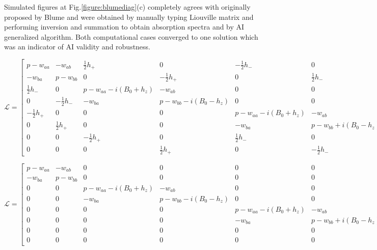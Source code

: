 Simulated figures at Fig.\ref{figure:blumediag}(c) completely agrees with originally proposed by Blume \cite{blume} and were obtained by manually typing Liouville matrix and performing inversion and summation to obtain absorption spectra and by AI generalized algorithm. Both computational cases converged to one solution which was an indicator of AI validity and robustness.           
           
\clearpage
\begin{landscape}
\begin{equation}\label{eq:60}
\mathcal{L} = \begin{bmatrix}
       p-w_{aa} & -w_{ab} & \frac{1}{2}h_+ & 0 & -\frac{1}{2}h_- & 0 & 0 & 0  \\[0.3em]
       -w_{ba} & p-w_{bb} & 0 & -\frac{1}{2}h_+ & 0 & \frac{1}{2}h_- & 0 & 0  \\[0.3em]
       \frac{1}{2}h_- & 0 & p-w_{aa}-i(B_0+h_z) & -w_{ab} & 0 & 0 & -\frac{1}{2}h_- & 0  \\[0.3em]
       0 & -\frac{1}{2}h_- & -w_{ba} & p-w_{bb}-i(B_0-h_z) & 0 & 0 & 0 & \frac{1}{2}h_-  \\[0.3em]
       -\frac{1}{2}h_+ & 0 & 0 & 0 & p-w_{aa}-i(B_0+h_z) & -w_{ab} & \frac{1}{2}h_+ & 0  \\[0.3em]
       0 & \frac{1}{2}h_+ & 0 & 0 & -w_{ba} & p-w_{bb}+i(B_0-h_z) & 0 & -\frac{1}{2}h_+  \\[0.3em]
       0 & 0 & -\frac{1}{2}h_+ & 0 & \frac{1}{2}h_- & 0 & p-w_{aa} & -w_{ab}  \\[0.3em]
       0 & 0 & 0 & \frac{1}{2}h_+ & 0 & -\frac{1}{2}h_- & -w_{ba} & p-w_{bb} 
     \end{bmatrix}
\end{equation}
\end{landscape} 

\begin{landscape}
\begin{equation}\label{eq:61}
\mathcal{L} = \begin{bmatrix}
       p-w_{aa} & -w_{ab} & 0 & 0 & 0 & 0 & 0 & 0  \\[0.3em]
       -w_{ba} & p-w_{bb} & 0 & 0 & 0 & 0 & 0 & 0  \\[0.3em]
       0 & 0 & p-w_{aa}-i(B_0+h_z) & -w_{ab} & 0 & 0 & 0 & 0  \\[0.3em]
       0 & 0 & -w_{ba} & p-w_{bb}-i(B_0-h_z) & 0 & 0 & 0 & 0  \\[0.3em]
       0 & 0 & 0 & 0 & p-w_{aa}-i(B_0+h_z) & -w_{ab} & 0 & 0  \\[0.3em]
       0 & 0 & 0 & 0 & -w_{ba} & p-w_{bb}+i(B_0-h_z) & 0 & 0  \\[0.3em]
       0 & 0 & 0 & 0 & 0 & 0 & p-w_{aa} & -w_{ab}  \\[0.3em]
       0 & 0 & 0 & 0 & 0 & 0 & -w_{ba} & p-w_{bb} 
     \end{bmatrix}
\end{equation}
\end{landscape} 

